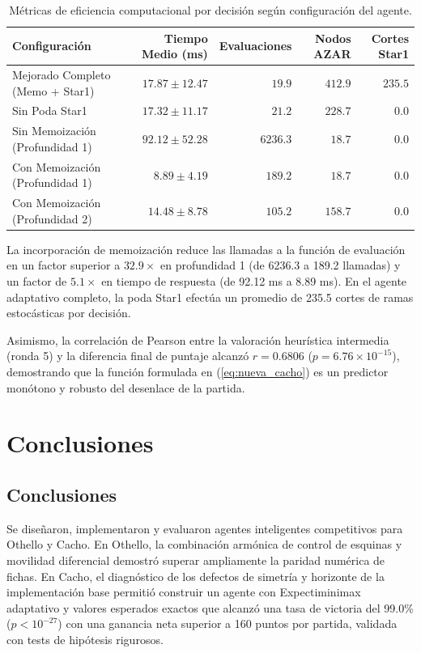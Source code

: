 \documentclass[10pt, a4paper]{article}
\begin{document}
\begin{table}[htbp]
\centering
\small
\caption{Métricas de eficiencia computacional por decisión según configuración del agente.}
\label{tab:eficiencia_cacho}
\begin{tabular}{lrrrr}
\toprule
\textbf{Configuración} & \textbf{Tiempo Medio (ms)} & \textbf{Evaluaciones} & \textbf{Nodos AZAR} & \textbf{Cortes Star1} \\
\midrule
Mejorado Completo (Memo + Star1) & $17.87 \pm 12.47$ & $\mathbf{19.9}$ & $412.9$ & $\mathbf{235.5}$ \\
Sin Poda Star1 & $17.32 \pm 11.17$ & $21.2$ & $228.7$ & $0.0$ \\
Sin Memoización (Profundidad 1) & $92.12 \pm 52.28$ & $6236.3$ & $18.7$ & $0.0$ \\
Con Memoización (Profundidad 1) & $\mathbf{8.89 \pm 4.19}$ & $189.2$ & $18.7$ & $0.0$ \\
Con Memoización (Profundidad 2) & $14.48 \pm 8.78$ & $105.2$ & $158.7$ & $0.0$ \\
\bottomrule
\end{tabular}
\end{table}

La incorporación de memoización reduce las llamadas a la función de evaluación en un factor superior a $32.9\times$ en profundidad 1 (de 6236.3 a 189.2 llamadas) y un factor de $5.1\times$ en tiempo de respuesta (de 92.12 ms a 8.89 ms). En el agente adaptativo completo, la poda Star1 efectúa un promedio de 235.5 cortes de ramas estocásticas por decisión.

Asimismo, la correlación de Pearson entre la valoración heurística intermedia (ronda 5) y la diferencia final de puntaje alcanzó $r = 0.6806$ ($p = 6.76 \times 10^{-15}$), demostrando que la función formulada en (\ref{eq:nueva_cacho}) es un predictor monótono y robusto del desenlace de la partida.

\section{Conclusiones}

\subsection{Conclusiones}
Se diseñaron, implementaron y evaluaron agentes inteligentes competitivos para Othello y Cacho. En Othello, la combinación armónica de control de esquinas y movilidad diferencial demostró superar ampliamente la paridad numérica de fichas. En Cacho, el diagnóstico de los defectos de simetría y horizonte de la implementación base permitió construir un agente con Expectiminimax adaptativo y valores esperados exactos que alcanzó una tasa de victoria del 99.0\% ($p < 10^{-27}$) con una ganancia neta superior a 160 puntos por partida, validada con tests de hipótesis rigurosos.
\end{document}
